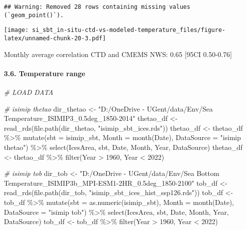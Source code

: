 \documentclass[
]{article}
\newenvironment{Shaded}{\begin{snugshade}}{\end{snugshade}}
\newcommand{\AttributeTok}[1]{\textcolor[rgb]{0.77,0.63,0.00}{#1}}
\newcommand{\CommentTok}[1]{\textcolor[rgb]{0.56,0.35,0.01}{\textit{#1}}}
\newcommand{\DecValTok}[1]{\textcolor[rgb]{0.00,0.00,0.81}{#1}}
\newcommand{\FunctionTok}[1]{\textcolor[rgb]{0.00,0.00,0.00}{#1}}
\newcommand{\NormalTok}[1]{#1}
\newcommand{\OtherTok}[1]{\textcolor[rgb]{0.56,0.35,0.01}{#1}}
\newcommand{\SpecialCharTok}[1]{\textcolor[rgb]{0.00,0.00,0.00}{#1}}
\newcommand{\StringTok}[1]{\textcolor[rgb]{0.31,0.60,0.02}{#1}}
\begin{document}
\begin{verbatim}
## Warning: Removed 28 rows containing missing values (`geom_point()`).
\end{verbatim}

\texttt{[image: si\_sbt\_in-situ-ctd-vs-modeled-temperature\_files/figure-latex/unnamed-chunk-20-3.pdf]}

Monthly average correlation CTD and CMEMS NWS: 0.65 {[}95CI 0.50-0.76{]}

\hypertarget{temperature-range}{%
\paragraph{3.6. Temperature range}\label{temperature-range}}

\begin{Shaded}
\begin{Highlighting}[]
\CommentTok{\# LOAD DATA}

\CommentTok{\# isimip thetao}
\NormalTok{dir\_thetao }\OtherTok{\textless{}{-}} \StringTok{"D:/OneDrive {-} UGent/data/Env/Sea Temperature\_ISIMIP3\_0.5deg\_1850{-}2014"}
\NormalTok{thetao\_df }\OtherTok{\textless{}{-}} \FunctionTok{read\_rds}\NormalTok{(}\FunctionTok{file.path}\NormalTok{(dir\_thetao, }\StringTok{"isimip\_sbt\_ices.rds"}\NormalTok{))}
\NormalTok{thetao\_df }\OtherTok{\textless{}{-}}\NormalTok{ thetao\_df }\SpecialCharTok{\%\textgreater{}\%} 
  \FunctionTok{mutate}\NormalTok{(}\AttributeTok{sbt =}\NormalTok{ isimip\_sbt,}
         \AttributeTok{Month =} \FunctionTok{month}\NormalTok{(Date),}
         \AttributeTok{DataSource =} \StringTok{"isimip thetao"}\NormalTok{) }\SpecialCharTok{\%\textgreater{}\%}
  \FunctionTok{select}\NormalTok{(IcesArea, sbt, Date, Month, Year, DataSource)}
\NormalTok{thetao\_df }\OtherTok{\textless{}{-}}\NormalTok{ thetao\_df }\SpecialCharTok{\%\textgreater{}\%} \FunctionTok{filter}\NormalTok{(Year }\SpecialCharTok{\textgreater{}} \DecValTok{1960}\NormalTok{, Year }\SpecialCharTok{\textless{}} \DecValTok{2022}\NormalTok{)}

\CommentTok{\# isimip tob}
\NormalTok{dir\_tob }\OtherTok{\textless{}{-}} \StringTok{"D:/OneDrive {-} UGent/data/Env/Sea Bottom Temperature\_ISIMIP3b\_MPI{-}ESM1{-}2HR\_0.5deg\_1850{-}2100"}
\NormalTok{tob\_df }\OtherTok{\textless{}{-}} \FunctionTok{read\_rds}\NormalTok{(}\FunctionTok{file.path}\NormalTok{(dir\_tob, }\StringTok{"isimip\_sbt\_ices\_hist\_ssp126.rds"}\NormalTok{))}
\NormalTok{tob\_df }\OtherTok{\textless{}{-}}\NormalTok{ tob\_df }\SpecialCharTok{\%\textgreater{}\%} \FunctionTok{mutate}\NormalTok{(}\AttributeTok{sbt =} \FunctionTok{as.numeric}\NormalTok{(isimip\_sbt),}
                            \AttributeTok{Month =} \FunctionTok{month}\NormalTok{(Date),}
                            \AttributeTok{DataSource =} \StringTok{"isimip tob"}\NormalTok{) }\SpecialCharTok{\%\textgreater{}\%}
  \FunctionTok{select}\NormalTok{(IcesArea, sbt, Date, Month, Year, DataSource)}
\NormalTok{tob\_df }\OtherTok{\textless{}{-}}\NormalTok{ tob\_df }\SpecialCharTok{\%\textgreater{}\%} \FunctionTok{filter}\NormalTok{(Year }\SpecialCharTok{\textgreater{}} \DecValTok{1960}\NormalTok{, Year }\SpecialCharTok{\textless{}} \DecValTok{2022}\NormalTok{)}



\end{Highlighting}
\end{Shaded}
\end{document}
